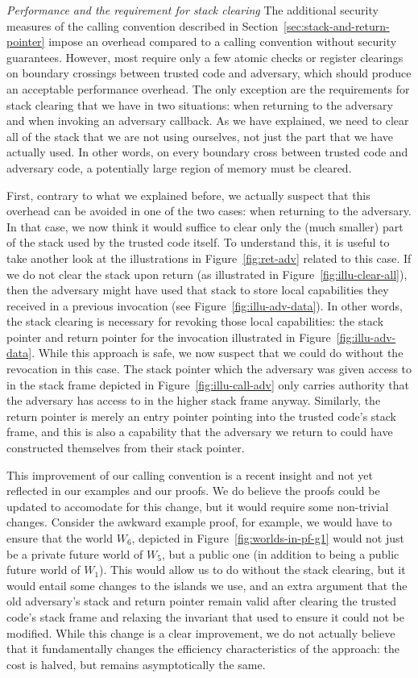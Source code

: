 \documentclass[format=acmsmall, review=true, screen=true]{acmart}
\renewcommand{\sectionname}{Section}
\begin{document}
\emph{Performance and the requirement for stack clearing} The additional
security measures of the calling convention described in
\sectionname~\ref{sec:stack-and-return-pointer} impose an overhead compared to a
calling convention without security guarantees. However, most require only a few
atomic checks or register clearings on boundary crossings between trusted code
and adversary, which should produce an acceptable performance overhead. The only
exception are the requirements for stack clearing that we have in two
situations: when returning to the adversary and when invoking an adversary
callback. As we have explained, we need to clear all of the stack that we are
not using ourselves, not just the part that we have actually used. In other
words, on every boundary cross between trusted code and adversary code, a
potentially large region of memory must be cleared.

First, contrary to what we explained before, we actually suspect that this overhead can be avoided in one of the two cases: when returning to the adversary.
In that case, we now think it would suffice to clear only the (much smaller) part of the stack used by the trusted code itself.
To understand this, it is useful to take another look at the illustrations in Figure~\ref{fig:ret-adv} related to this case.
If we do not clear the stack upon return (as illustrated in Figure~\ref{fig:illu-clear-all}), then the adversary might have used that stack to store local capabilities they received in a previous invocation (see Figure~\ref{fig:illu-adv-data}).
In other words, the stack clearing is necessary for revoking those local capabilities: the stack pointer and return pointer for the invocation illustrated in Figure~\ref{fig:illu-adv-data}.
While this approach is safe, we now suspect that we could do without the revocation in this case.
The stack pointer which the adversary was given access to in the stack frame depicted in Figure~\ref{fig:illu-call-adv} only carries authority that the adversary has access to in the higher stack frame anyway.
Similarly, the return pointer is merely an entry pointer pointing into the trusted code's stack frame, and this is also a capability that the adversary we return to could have constructed themselves from their stack pointer.

This improvement of our calling convention is a recent insight and not yet reflected in our examples and our proofs.
We do believe the proofs could be updated to accomodate for this change, but it would require some non-trivial changes.
Consider the awkward example proof, for example, we would have to ensure that the world $W_6$, depicted in Figure~\ref{fig:worlds-in-pf-g1} would not just be a private future world of $W_5$, but a public one (in addition to being a public future world of $W_1$).
This would allow us to do without the stack clearing, but it would entail some changes to the islands we use, and an extra argument that the old adversary's stack and return pointer remain valid after clearing the trusted code's stack frame and relaxing the invariant that used to ensure it could not be modified.
While this change is a clear improvement, we do not actually believe that it fundamentally changes the efficiency characteristics of the approach: the cost is halved, but remains asymptotically the same.
\end{document}
